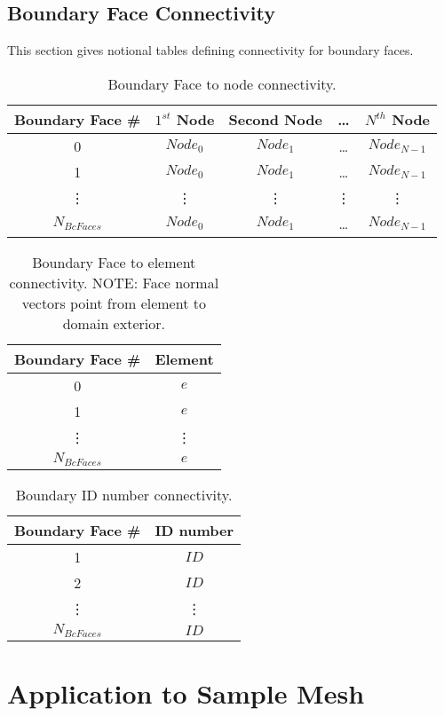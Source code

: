 \documentclass[letterpaper]{article}
\begin{document}
\subsection{Boundary Face Connectivity}
This section gives notional tables defining connectivity for boundary faces.  
\begin{table}[h!]
\centering
\begin{tabular}{|c|cccc|}
\hline
Boundary Face \#  & $1^{st}$ Node  & Second Node & \dots & $N^{th}$ Node \\
\hline
 0 & $Node_{0}$ & $Node_{1}$ & \dots & $Node_{N-1}$ \\
 1 & $Node_{0}$ & $Node_{1}$ & \dots & $Node_{N-1}$ \\
   \vdots & \vdots & \vdots & \vdots & \vdots \\
   $N_{BcFaces}$ & $Node_{0}$ & $Node_{1}$ & \dots & $Node_{N-1}$ \\
\hline 
\end{tabular}
\caption{Boundary Face to node connectivity.}
\end{table}

\begin{table}[h!]
\centering
\begin{tabular}{|c|c|}
\hline
Boundary Face \#  & Element  \\
\hline
 0 & $e$ \\
 1 & $e$ \\
 \vdots & \vdots \\
 $N_{BcFaces}$ & $e$ \\
\hline 
\end{tabular}
\caption{Boundary Face to element connectivity.  NOTE: Face normal vectors point from element to domain exterior.}
\end{table}

\begin{table}[h!]
\centering
\begin{tabular}{|c|c|}
\hline
Boundary Face \#  & ID number  \\
\hline
 1 & $ID$ \\
 2 & $ID$ \\
 \vdots & \vdots  \\
 $N_{BcFaces}$ & $ID$ \\
\hline 
\end{tabular}
\caption{Boundary ID number connectivity.}
\end{table}

\section{Application to Sample Mesh}
\end{document}
